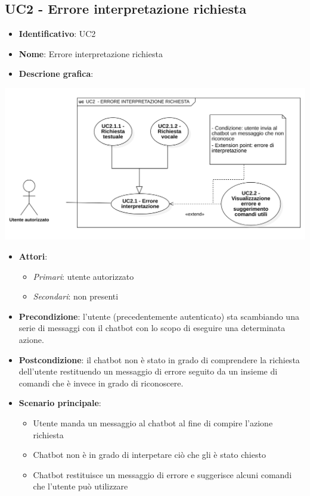\subsection{UC2 - Errore interpretazione richiesta}
\begin{itemize}
    \item \textbf{Identificativo}: UC2
    \item \textbf{Nome}: Errore interpretazione richiesta
    \item \textbf{Descrione grafica}:
\end{itemize}

\begin{center}
    \includegraphics[scale=0.50]{images/UC2.png} 
\end{center}

\begin{itemize}
    \item \textbf{Attori}:
    \begin{itemize} 
        \item \textit{Primari}: utente autorizzato
        \item \textit{Secondari}: non presenti
    \end{itemize}
 \item \textbf{Precondizione}: l'utente (precedentemente autenticato) sta scambiando una serie di messaggi con il chatbot con lo scopo di eseguire una determinata azione.
 \item \textbf{Postcondizione}: il chatbot non è stato in grado di comprendere la richiesta dell'utente restituendo un messaggio di errore seguito da un insieme di comandi che è invece in grado di riconoscere.   
 \item \textbf{Scenario principale}: 
    \begin{itemize}
        \item Utente manda un messaggio al chatbot al fine di compire l'azione richiesta
        \item Chatbot non è in grado di interpetare ciò che gli è stato chiesto 
        \item Chatbot restituisce un messaggio di errore e suggerisce alcuni comandi che l'utente può utilizzare
    \end{itemize}
\end{itemize}